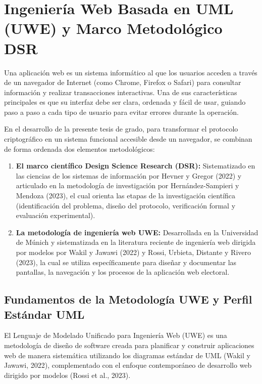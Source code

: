 \section{Ingeniería Web Basada en UML (UWE) y Marco Metodológico DSR}
\label{sec:ingenieria_web_uwe}

Una aplicación web es un sistema informático al que los usuarios acceden a través de un navegador de Internet (como Chrome, Firefox o Safari) para consultar información y realizar transacciones interactivas. Una de sus características principales es que su interfaz debe ser clara, ordenada y fácil de usar, guiando paso a paso a cada tipo de usuario para evitar errores durante la operación.

En el desarrollo de la presente tesis de grado, para transformar el protocolo criptográfico en un sistema funcional accesible desde un navegador, se combinan de forma ordenada dos elementos metodológicos:
\begin{enumerate}
	\item \textbf{El marco científico Design Science Research (DSR):} Sistematizado en las ciencias de los sistemas de información por Hevner y Gregor (2022) y articulado en la metodología de investigación por Hernández-Sampieri y Mendoza (2023), el cual orienta las etapas de la investigación científica (identificación del problema, diseño del protocolo, verificación formal y evaluación experimental).
	\item \textbf{La metodología de ingeniería web UWE:} Desarrollada en la Universidad de Múnich y sistematizada en la literatura reciente de ingeniería web dirigida por modelos por Wakil y Jawawi (2022) y Rossi, Urbieta, Distante y Rivero (2023), la cual se utiliza específicamente para diseñar y documentar las pantallas, la navegación y los procesos de la aplicación web electoral.
\end{enumerate}

\subsection{Fundamentos de la Metodología UWE y Perfil Estándar UML}
\label{subsec:fundamentos_uwe}

El Lenguaje de Modelado Unificado para Ingeniería Web (UWE) es una metodología de diseño de software creada para planificar y construir aplicaciones web de manera sistemática utilizando los diagramas estándar de UML (Wakil y Jawawi, 2022), complementado con el enfoque contemporáneo de desarrollo web dirigido por modelos (Rossi et al., 2023).

